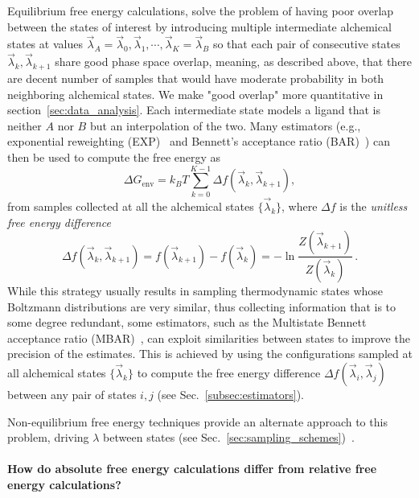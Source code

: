 \documentclass[9pt,bestpractices]{livecoms}
\begin{document}
Equilibrium free energy calculations, solve the problem of having poor overlap between the states of interest by introducing multiple intermediate alchemical states at values $\vec{\lambda}_A = \vec{\lambda}_0, \vec{\lambda}_1, \cdots, \vec{\lambda}_K = \vec{\lambda}_B$ so that each pair of consecutive states $\vec{\lambda}_k, \vec{\lambda}_{k+1}$ share good phase space overlap, meaning, as described above, that there  are decent number of samples that would have moderate probability in both neighboring alchemical states. We make "good overlap" more quantitative in section~\ref{sec:data_analysis}. 
Each intermediate state models a ligand that is neither $A$ nor $B$ but an interpolation of the two.
Many estimators (e.g., exponential reweighting (EXP)~\cite{zwanzig1954hightemperature} and Bennett's acceptance ratio (BAR)~\cite{bennett1976efficient,shirts2003equilibrium}) can then be used to compute the free energy as
\begin{equation}
    \Delta G_{\mathrm{env}} = k_BT \sum_{k=0}^{K-1} \Delta f(\vec{\lambda}_k, \vec{\lambda}_{k+1}),
\end{equation}
from samples collected at all the alchemical states $\{\vec{\lambda}_k \}$, where $\Delta f$ is the \emph{unitless free energy difference}
\begin{equation}
    \Delta f(\vec{\lambda}_k, \vec{\lambda}_{k+1}) = f(\vec{\lambda}_{k+1}) - f(\vec{\lambda}_k) = - \ln \frac{Z(\vec{\lambda}_{k+1})}{Z(\vec{\lambda}_k)} \, .
\end{equation}
While this strategy usually results in sampling thermodynamic states whose Boltzmann distributions are very similar, thus collecting information that is to some degree redundant, some estimators, such as the Multistate Bennett acceptance ratio (MBAR)~\cite{shirts2008statisticallya}, can exploit similarities between states to improve the precision of the estimates. This is achieved by using the configurations sampled at all alchemical states $\{\vec{\lambda}_k \}$ to compute the free energy difference $\Delta f(\vec{\lambda}_i, \vec{\lambda}_{j})$ between any pair of states $i,j$ (see Sec.~\ref{subsec:estimators}).

Non-equilibrium free energy techniques provide an alternate approach to this problem, driving $\lambda$ between states (see Sec.~\ref{sec:sampling_schemes})~\cite{jarzynski1997nonequilibrium,jarzynski1998equilibrium,crooks2000pathensemble, gapsys2020large}.

\paragraph{How do absolute free energy calculations differ from relative free energy calculations?}
\end{document}

